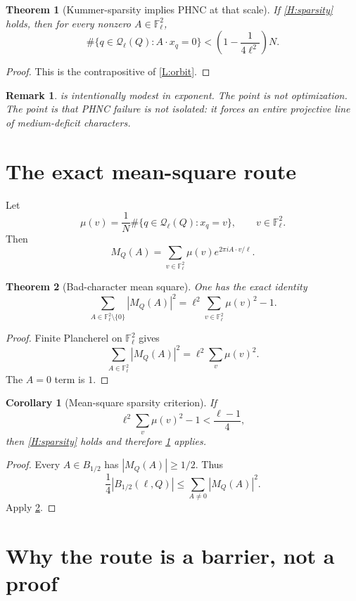 \documentclass[11pt]{article}
\newtheorem{theorem}{Theorem}
\newtheorem{corollary}{Corollary}
\newtheorem{remark}{Remark}
\newcommand{\F}{\mathbb F}
\newcommand{\1}{\mathbf 1}
\begin{document}
\begin{theorem}[Kummer-sparsity implies PHNC at that scale]\label{T:sparsity-phnc}
If \cref{H:sparsity} holds, then for every nonzero \(A\in\F_\ell^2\),
\[
\#\{q\in\mathcal Q_\ell(Q):A\cdot x_q=0\}
<
\left(1-\frac1{4\ell^2}\right)N.
\]
\end{theorem}

\begin{proof}
This is the contrapositive of \cref{L:orbit}.
\end{proof}

\begin{remark}
 is intentionally modest in exponent.  The point is not optimization.  The point is that PHNC failure is not isolated: it forces an entire projective line of medium-deficit characters.
\end{remark}

\section{The exact mean-square route}

Let
\[
\mu(v)=\frac1N\#\{q\in\mathcal Q_\ell(Q):x_q=v\},
\qquad v\in\F_\ell^2.
\]
Then
\[
M_Q(A)=\sum_{v\in\F_\ell^2}\mu(v)e^{2\pi i A\cdot v/\ell}.
\]

\begin{theorem}[Bad-character mean square]\label{T:meansquare}
One has the exact identity
\[
\sum_{A\in\F_\ell^2\setminus\{0\}}|M_Q(A)|^2
=
\ell^2\sum_{v\in\F_\ell^2}\mu(v)^2-1.
\]
\end{theorem}

\begin{proof}
Finite Plancherel on \(\F_\ell^2\) gives
\[
\sum_{A\in\F_\ell^2}|M_Q(A)|^2
=
\ell^2\sum_v\mu(v)^2.
\]
The \(A=0\) term is \(1\).
\end{proof}

\begin{corollary}[Mean-square sparsity criterion]\label{C:ms}
If
\[
\ell^2\sum_v\mu(v)^2-1<\frac{\ell-1}{4},
\]
then \cref{H:sparsity} holds and therefore \cref{T:sparsity-phnc} applies.
\end{corollary}

\begin{proof}
Every \(A\in B_{1/2}\) has \(|M_Q(A)|\ge1/2\).  Thus
\[
\frac14|B_{1/2}(\ell,Q)|
\le
\sum_{A\ne0}|M_Q(A)|^2.
\]
Apply \cref{T:meansquare}.
\end{proof}

\section{Why the route is a barrier, not a proof}
\end{document}
